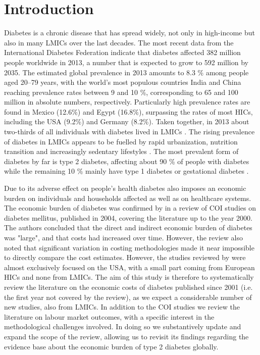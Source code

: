 \documentclass[12pt,english]{article}
\begin{document}
\section{Introduction}
Diabetes is a chronic disease that has spread widely, not only in high-income but also in many \acp{LMIC} over the last decades. The most recent data from the International Diabetes Federation indicate that diabetes affected 382 million people worldwide in 2013, a number that is expected to grow to 592 million by 2035. The estimated global prevalence in 2013 amounts to 8.3 \% among people aged 20--79 years, with the world's most populous countries India and China reaching prevalence rates between 9 and 10 \%, corresponding to 65 and 100 million in absolute numbers, respectively. Particularly high prevalence rates are found in Mexico (12.6\%) and Egypt (16.8\%), surpassing the rates of most \acp{HIC}, including the USA (9.2\%) and Germany (8.2\%).\parencite{InternationalDiabetesFederation2013} Taken together, in 2013 about two-thirds of all individuals with diabetes lived in \acp{LMIC} \parencite{InternationalDiabetesFederation2013}. The rising prevalence of diabetes in \acp{LMIC} appears to be fuelled by rapid urbanization, nutrition transition and increasingly sedentary lifestyles \parencite{Hu2011a}. The most prevalent form of diabetes by far is type 2 diabetes, affecting about 90 \% of people with diabetes while the remaining 10 \% mainly have type 1 diabetes or gestational diabetes \parencite{InternationalDiabetesFederation2013}.

Due to its adverse effect on people's health diabetes also imposes an economic burden on individuals and households affected as well as on healthcare systems. The economic burden of diabetes was confirmed by   in a review of \ac{COI} studies on diabetes mellitus, published in 2004, covering the literature up to the year 2000. The authors concluded that the direct and indirect economic burden of diabetes was "large", and that costs had increased over time. However, the review also noted that significant variation in costing methodologies made it near impossible to directly compare the cost estimates. However, the studies reviewed by \textcite{Ettaro2004} were almost exclusively focused on the USA, with a small part coming from European \acp{HIC} and none from \acp{LMIC}. The aim of this study is therefore to systematically review the literature on the economic costs of diabetes published since 2001 (i.e. the first year not covered by the \textcite{Ettaro2004} review), as we expect a considerable number of new studies, also from \acp{LMIC}. In addition to the \ac{COI} studies we review the literature on labour market outcomes, with a specific interest in the methodological challenges involved. In doing so we substantively update and expand the scope of the \textcite{Ettaro2004} review, allowing us to revisit its findings regarding the evidence base about the economic burden of type 2 diabetes globally.
\end{document}
